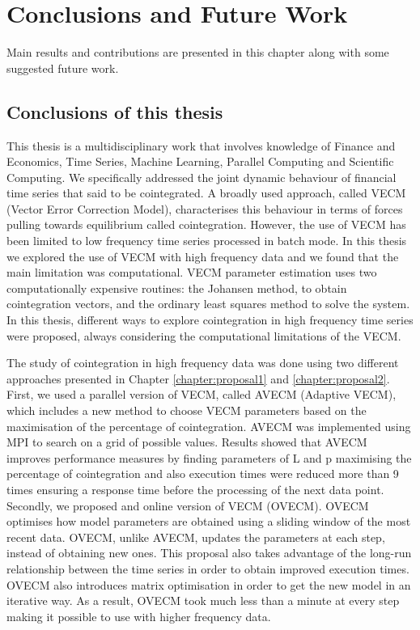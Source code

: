 
\chapter{Conclusions and Future Work}

Main results and contributions are presented in this chapter along with some
suggested future work.

\vspace{0.5cm} 

\section{Conclusions of this thesis}

This thesis is a multidisciplinary work that involves knowledge of Finance
and Economics, Time Series, Machine Learning, Parallel Computing and Scientific
Computing. We specifically addressed the joint dynamic behaviour of financial time
series that said to be cointegrated. A broadly used approach, called VECM (Vector
Error Correction Model), characterises this behaviour in terms of forces pulling
towards equilibrium called cointegration. However, the use of VECM has been
limited to low frequency time series processed in batch mode. In this thesis we
explored the use of VECM with high frequency data and we found that the main
limitation was computational. VECM parameter estimation uses two computationally
expensive routines: the Johansen method, to obtain cointegration vectors, and
the ordinary least squares method to solve the system. In this thesis, different
ways to explore cointegration in high frequency time series were proposed,
always considering the computational limitations of the VECM.

The study of cointegration in high frequency data was done using two different
approaches presented in Chapter \ref{chapter:proposal1} and
\ref{chapter:proposal2}. First, we used a parallel version of VECM, called AVECM
(Adaptive VECM), which includes a new method to choose VECM parameters based on
the maximisation of the percentage of cointegration. AVECM was implemented using
MPI to search on a grid of possible values. Results showed that AVECM improves
performance measures by finding parameters of L and p maximising the percentage
of cointegration and also execution times were reduced more than 9 times
ensuring a response time before the processing of the next data point.
Secondly, we proposed and online version of VECM (OVECM). OVECM optimises how
model parameters are obtained using a sliding window of the most recent data.
OVECM, unlike AVECM, updates the parameters at each step, instead of obtaining
new ones. This proposal also takes advantage of the long-run relationship
between the time series in order to obtain improved execution times. OVECM also
introduces matrix optimisation in order to get the new model in an iterative
way.  As a result, OVECM took much less than a minute at every
step making it possible to use with higher frequency data.  

